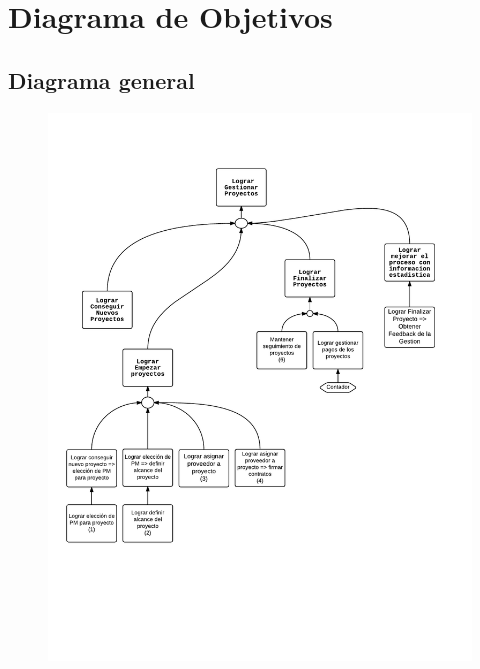 \section{Diagrama de Objetivos}
\subsection{Diagrama general}
\begin{figure}[H]
\includegraphics[width=\textwidth, clip=true, trim=15pt 170pt 15pt 80pt]{imagenes/objetivos/objetivos10.pdf}
\end{figure}

